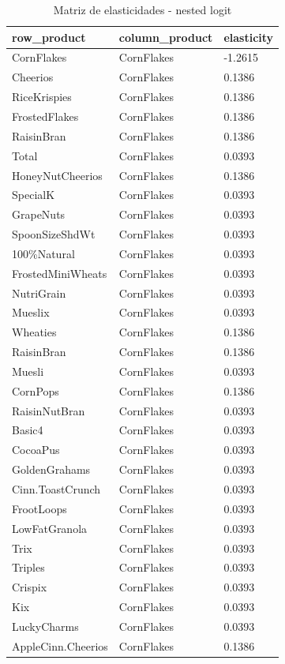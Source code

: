 \begin{table}[!htbp]
\centering
\caption{Matriz de elasticidades - nested logit}
\label{tab:elas-nested}
\scriptsize
\begin{tabular}{lll}
\hline
row\_product & column\_product & elasticity
\\
\hline
CornFlakes & CornFlakes & -1.2615
\\
Cheerios & CornFlakes & 0.1386
\\
RiceKrispies & CornFlakes & 0.1386
\\
FrostedFlakes & CornFlakes & 0.1386
\\
RaisinBran & CornFlakes & 0.1386
\\
Total & CornFlakes & 0.0393
\\
HoneyNutCheerios & CornFlakes & 0.1386
\\
SpecialK & CornFlakes & 0.0393
\\
GrapeNuts & CornFlakes & 0.0393
\\
SpoonSizeShdWt & CornFlakes & 0.0393
\\
100\%Natural & CornFlakes & 0.0393
\\
FrostedMiniWheats & CornFlakes & 0.0393
\\
NutriGrain & CornFlakes & 0.0393
\\
Mueslix & CornFlakes & 0.0393
\\
Wheaties & CornFlakes & 0.1386
\\
RaisinBran & CornFlakes & 0.1386
\\
Muesli & CornFlakes & 0.0393
\\
CornPops & CornFlakes & 0.1386
\\
RaisinNutBran & CornFlakes & 0.0393
\\
Basic4 & CornFlakes & 0.0393
\\
CocoaPus & CornFlakes & 0.0393
\\
GoldenGrahams & CornFlakes & 0.0393
\\
Cinn.ToastCrunch & CornFlakes & 0.0393
\\
FrootLoops & CornFlakes & 0.0393
\\
LowFatGranola & CornFlakes & 0.0393
\\
Trix & CornFlakes & 0.0393
\\
Triples & CornFlakes & 0.0393
\\
Crispix & CornFlakes & 0.0393
\\
Kix & CornFlakes & 0.0393
\\
LuckyCharms & CornFlakes & 0.0393
\\
AppleCinn.Cheerios & CornFlakes & 0.1386

\end{tabular}
\end{table}
